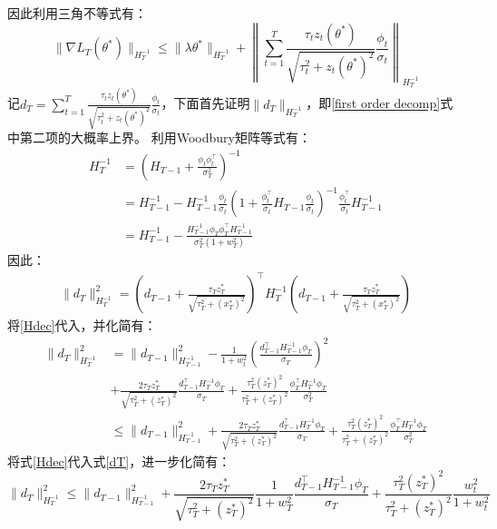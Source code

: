 \documentclass[UTF8,a4paper,10.5pt]{ctexart}
\begin{document}
因此利用三角不等式有：
\begin{equation}
	\|\nabla L_T(\theta^*)\|_{H_T^{-1}} \leq \|\lambda\theta^*\|_{H_T^{-1}}+ \left\lVert \sum_{t=1}^T\frac{\tau_t z_t(\theta^*)}{\sqrt{\tau_t^2 + z_t(\theta^*)^2}}\frac{\phi_t}{\sigma_t}\right\rVert_{H^{-1}_T}
	\label{first order decomp}
\end{equation}
记$d_T = \sum_{t=1}^T\frac{\tau_t z_t(\theta^*)}{\sqrt{\tau_t^2 + z_t(\theta^*)^2}}\frac{\phi_t}{\sigma_t}$，下面首先证明$\|d_T\|_{H_T^{-1}}$，即\ref{first order decomp}式中第二项的大概率上界。
利用Woodbury矩阵等式有：
\begin{align}
	H_T^{-1} &= \left(H_{T-1} + \frac{\phi_t\phi_t^\top}{\sigma_T^2}\right)^{-1} \nonumber \\
	& = H_{T-1}^{-1} - H_{T-1}^{-1}\frac{\phi_t}{\sigma_t}(1+ \frac{\phi_t^\top}{\sigma_t} H_{T-1}\frac{\phi_t}{\sigma_t})^{-1}\frac{\phi_t^\top}{\sigma_t}H_{T-1}^{-1} \nonumber \\
	& = H_{T-1}^{-1} - \frac{H_{T-1}^{-1}\phi_T\phi_T^\top H_{T-1}^{-1}}{\sigma_T^2 (1+w_T^2)}
	\label{Hdec}
\end{align}
因此：
\begin{align*}
	\|d_T\|^2_{H_T^{-1}} = \left(d_{T-1}+ \frac{\tau_Tz_T^*}{\sqrt{\tau_T^2+(x^*_T)^2}}\right)^\top H_T^{-1} \left(d_{T-1}+ \frac{\tau_Tz_T^*}{\sqrt{\tau_T^2+(x^*_T)^2}}\right)
\end{align*}
将\ref{Hdec}代入，并化简有：
\begin{align}
	\|d_T\|^2_{H_T^{-1}} &= \|d_{T-1}\|^2_{H_{T-1}^{-1}} - \frac{1}{1+w_t^2}\left(\frac{d_{T-1}^\top H_{T-1}^{-1}\phi_T}{\sigma_T}\right)^2 \nonumber \\
	& + \frac{2\tau_T z^*_T}{\sqrt{\tau_T^2+(z^*_T)^2}}\frac{d_{T-1}^\top H_T^{-1}\phi_T}{\sigma_T} + \frac{\tau_T^2(z^*_T)^2}{\tau_T^2+(z^*_T)^2}\frac{\phi_T^\top H_T^{-1}\phi_T}{\sigma_T^2} \nonumber \\
	& \leq \|d_{T-1}\|^2_{H_{T-1}^{-1}} + \frac{2\tau_T z^*_T}{\sqrt{\tau_T^2+(z^*_T)^2}}\frac{d_{T-1}^\top H_T^{-1}\phi_T}{\sigma_T} + \frac{\tau_T^2(z^*_T)^2}{\tau_T^2+(z^*_T)^2}\frac{\phi_T^\top H_T^{-1}\phi_T}{\sigma_T^2}
	\label{dT}
\end{align}
将式\ref{Hdec}代入式\ref{dT}，进一步化简有：
\begin{equation*}
	\|d_T\|^2_{H_T^{-1}} \leq \|d_{T-1}\|^2_{H_{T-1}^{-1}} + \frac{2\tau_T z^*_T}{\sqrt{\tau_T^2+(z^*_T)^2}}\frac{1}{1+w_T^2}\frac{d_{T-1}^\top H_{T-1}^{-1}\phi_T}{\sigma_T} + \frac{\tau_T^2(z^*_T)^2}{\tau_T^2+(z^*_T)^2}\frac{w_t^2}{1+w_t^2}
\end{equation*}
\end{document}
